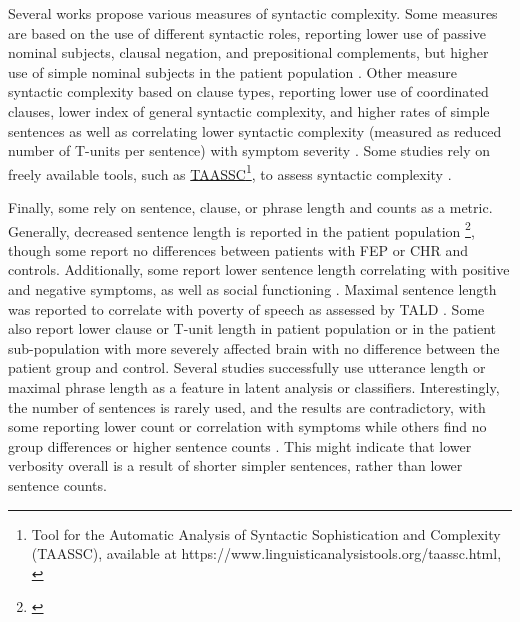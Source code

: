 Several works propose various measures of syntactic complexity. Some measures are based on the use of different syntactic roles, reporting lower use of passive nominal subjects, clausal negation, and prepositional complements, but higher use of simple nominal subjects in the patient population \citep{silva2022syntactic}. Other measure syntactic complexity based on clause types, reporting lower use of coordinated clauses, lower index of general syntactic complexity, and higher rates of simple sentences \citep{schneider2023syntactic} as well as correlating lower syntactic complexity (measured as reduced number of T-units per sentence) with symptom severity \citep{jeong2023exploring}. Some studies rely on freely available tools, such as \href{https://www.linguisticanalysistools.org/taassc.html}{TAASSC}\footnote{ Tool for the Automatic Analysis of Syntactic Sophistication and Complexity (TAASSC), available at https://www.linguisticanalysistools.org/taassc.html, \citep{kyle2016measuring}}, to assess syntactic complexity \citep{liang2022widespread, silva2022syntactic}.

Finally, some rely on sentence, clause, or phrase length and counts as a metric. Generally, decreased sentence length is reported in the patient population \footnote{\citep{iter2018automatic, morgan2021natural, spencer2021lower, tang2021natural, bilgrami2022construct, silva2022syntactic, nettekoven2023semantic, schneider2023syntactic}}, though some report no differences between patients with FEP \citep{liang2022widespread} or CHR \citep{gupta2018automated, haas2020linking} and controls. Additionally, some report lower sentence length correlating with positive \citep{liebenthal2022linguistic} and negative \citep{bilgrami2022construct} symptoms, as well as social functioning \citep{silva2022syntactic}. Maximal sentence length was reported to correlate with poverty of speech as assessed by TALD \citep{xu2020centroid}. Some also report lower clause or T-unit length in patient population \citep{silva2022syntactic} or in the patient sub-population with more severely affected brain \citep{liang2022widespread} with no difference between the patient group and control. Several studies successfully use utterance length \citep{tang2023latent} or maximal phrase length \citep{bedi2015automated} as a feature in latent analysis or classifiers. Interestingly, the number of sentences is rarely used, and the results are contradictory, with some reporting lower count \citep{iter2018automatic} or correlation with symptoms \citep{jeong2023exploring} while others find no group differences \citep{gupta2018automated, tang2021natural, schneider2023syntactic} or higher sentence counts \citep{morgan2021natural, nettekoven2023semantic}. This might indicate that lower verbosity overall is a result of shorter simpler sentences, rather than lower sentence counts.

